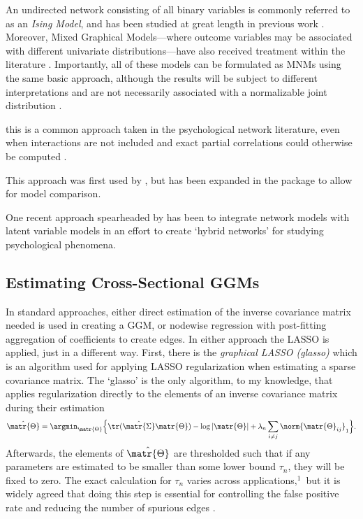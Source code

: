 An undirected network consisting of all binary variables is commonly referred to as an \textit{Ising Model}, and has been studied at great length in previous work \parencites(see)(){lauritzen1996graphical,van2014new,marsman2018introduction}. Moreover, Mixed Graphical Models---where outcome variables may be associated with different univariate distributions---have also received treatment within the literature \parencites(e.g.,)(){yang2014mixed,chen2014selection}. Importantly, all of these models can be formulated as MNMs using the same basic approach, although the results will be subject to different interpretations and are not necessarily associated with a normalizable joint distribution \parencites(cf.)(){yang2014mixed, haslbeck2018moderated}.

this is a common approach taken in the psychological network literature, even when interactions are not included and exact partial correlations could otherwise be computed \parencites(e.g.,)(){haslbeck2015mgm,epskamp2018gaussian}. 


This approach was first used by \textcite{haslbeck2017predictable}, but has been expanded in the  package to allow for model comparison.


One recent approach spearheaded by \textcite{epskamp2017generalized} has been to integrate network models with latent variable models in an effort to create `hybrid networks' for studying psychological phenomena.


\subsection{Estimating Cross-Sectional GGMs}
In standard approaches, either direct estimation of the inverse covariance matrix needed is used in creating a GGM, or nodewise regression with post-fitting aggregation of coefficients to create edges. In either approach the LASSO is applied, just in a different way. First, there is the \textit{graphical LASSO (glasso)} which is an algorithm used for applying LASSO regularization when estimating a sparse covariance matrix. The `glasso' is the only algorithm, to my knowledge, that applies regularization directly to the elements of an inverse covariance matrix during their estimation
\begin{equation}
    \hat{\matr{\Theta}} = \argmin_{\matr{\Theta}} \Big\{ \tr(\hat{\matr{\Sigma}} \matr{\Theta}) - \log |\matr{\Theta}| + \lambda_n \sum_{i \neq j} \norm{\matr{\Theta}_{ij}}_1 \Big\}.
\end{equation}
Afterwards, the elements of $\hat{\matr{\Theta}}$ are thresholded such that if any parameters are estimated to be smaller than some lower bound $\tau_n$, they will be fixed to zero. The exact calculation for $\tau_n$ varies across applications$,^1$ but it is widely agreed that doing this step is essential for controlling the false positive rate and reducing the number of spurious edges \cite{loh2013structure,meinshausen2006high,friedman2008sparse}. 

